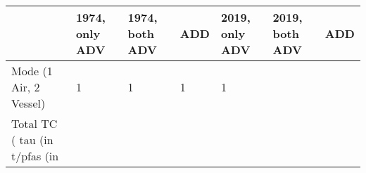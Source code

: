 \begin{tabular}{lllll}
& 1974, only ADV & 1974, both ADV & ADD & 2019, only ADV & 2019, both ADV & ADD \\ 
\hline 
Mode (1 Air, 2 Vessel) & 1 & 1 & 1 & 1 \\ 
Total TC (%
tau (in %
t/pfas (in %
\hline 
\end{tabular}